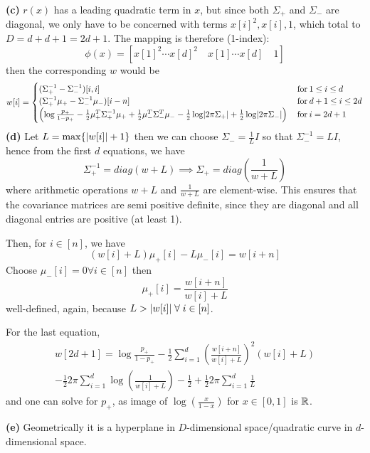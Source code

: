 \documentclass[a4paper, 11pt]{article}
\begin{document}
\begin{problem}
\textbf{(c)} $r(x)$ has a leading quadratic term in $x$, but since both $\Sigma_+$ and $\Sigma_-$ are diagonal, we only have to be concerned with terms $x[i]^2, x[i], 1$, which total to $D = d + d + 1 = 2d + 1$. The mapping is therefore (1-index): \begin{equation*}
\phi(x) = [x[1]^2  \cdots x[d]^2 \quad x[1] \cdots x[d] \quad 1]
\end{equation*}
then the corresponding $w$ would be \begin{equation*}
    w[i] = \begin{cases}
        (\Sigma_+^{-1} - \Sigma_-^{-1})[i, i] & \:\text{for}\: 1 \leq i \leq d \\
        (\Sigma_+^{-1} \mu_+ - \Sigma_-^{-1}\mu_-)[i-n] &\:\text{for}\: d + 1 \leq i \leq 2d \\
        \left(\log \frac{p_+}{1 - p_+} - \frac{1}{2} \mu_+^T \Sigma_+^{-1} \mu_+ + \frac{1}{2} \mu_-^T \Sigma_-^T \mu_- - \frac{1}{2} \log \lvert2\pi\Sigma_+\rvert + \frac{1}{2} \log \lvert2\pi\Sigma_-\rvert\right) & \:\text{for}\: i = 2d+1
    \end{cases}
\end{equation*}
\textbf{(d)} Let $L = \max\{\lvert w[i]\rvert + 1\}$ then we can choose $\Sigma_- = \frac{1}{L}I$ so that $\Sigma_-^{-1} = LI$, hence from the first $d$ equations, we have
\begin{equation*}
\Sigma_+^{-1} = diag(w + L) \implies \Sigma_+ = diag\left(\frac{1}{w + L}\right)
\end{equation*}
where arithmetic operations $w + L$ and $\frac{1}{w+L}$ are element-wise. This ensures that the covariance matrices are semi positive definite, since they are diagonal and all diagonal entries are positive (at least 1).

Then, for $i \in [n]$, we have \begin{equation*}
(w[i] + L)\mu_+[i] - L\mu_-[i] = w[i + n]
\end{equation*}
Choose $\mu_-[i] = 0 \forall i \in [n]$ then \begin{equation*}
\mu_+[i] = \frac{w[i + n]}{w[i] + L}
\end{equation*}
well-defined, again, because $L > \abs{w[i]} \forall i \in [n]$.

For the last equation, \begin{multline*}
w[2d+1] = \log \frac{p_+}{1-p_+} - \frac{1}{2} \sum_{i=1}^{d} \left(\frac{w[i + n]}{w[i] + L}\right)^2(w[i] + L) \\
- \frac{1}{2} 2\pi \sum_{i=1}^{d} \log\left(\frac{1}{w[i] + L}\right) - \frac{1}{2} + \frac{1}{2} 2\pi \sum_{i=1}^{d} \frac{1}{L}
\end{multline*}
and one can solve for $p_+$, as image of $\log\left(\frac{x}{1-x}\right)$ for $x \in [0, 1]$ is $\mathbb{R}$.

\textbf{(e)} Geometrically it is a hyperplane in $D$-dimensional space/quadratic curve in $d$-dimensional space.
\end{problem}
\end{document}
